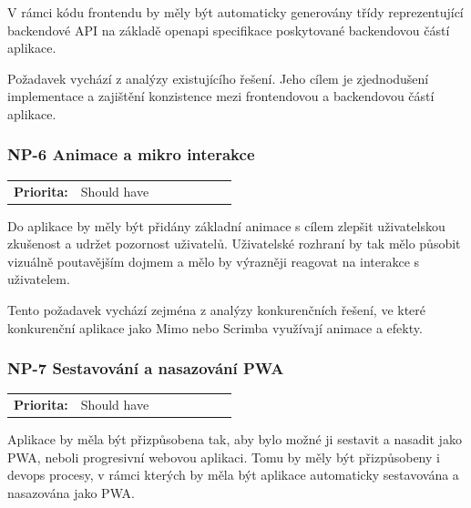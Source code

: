 V rámci kódu frontendu by měly být automaticky generovány třídy reprezentující backendové API na základě openapi %
specifikace poskytované backendovou částí aplikace.

Požadavek vychází z analýzy existujícího řešení. Jeho cílem je zjednodušení implementace a zajištění konzistence mezi frontendovou a backendovou částí aplikace.

\subsubsection{NP-6 Animace a mikro interakce}

\begin{tabular}{lp{0.7\linewidth}}
    \textbf{Priorita:} & Should have \\
\end{tabular}

Do aplikace by měly být přidány základní animace s cílem zlepšit uživatelskou zkušenost a udržet pozornost uživatelů. Uživatelské rozhraní by tak mělo působit vizuálně poutavějším dojmem a mělo by výrazněji reagovat na interakce s uživatelem.

Tento požadavek vychází zejména z analýzy konkurenčních řešení, ve které konkurenční aplikace jako Mimo nebo Scrimba využívají animace a efekty.

\subsubsection{NP-7 Sestavování a nasazování PWA}

\begin{tabular}{lp{0.7\linewidth}}
    \textbf{Priorita:} & Should have \\
\end{tabular}

Aplikace by měla být přizpůsobena tak, aby bylo možné ji sestavit a nasadit jako PWA, neboli progresivní webovou aplikaci. Tomu by měly být přizpůsobeny i devops procesy, v rámci kterých by měla být aplikace automaticky sestavována a nasazována jako PWA.

